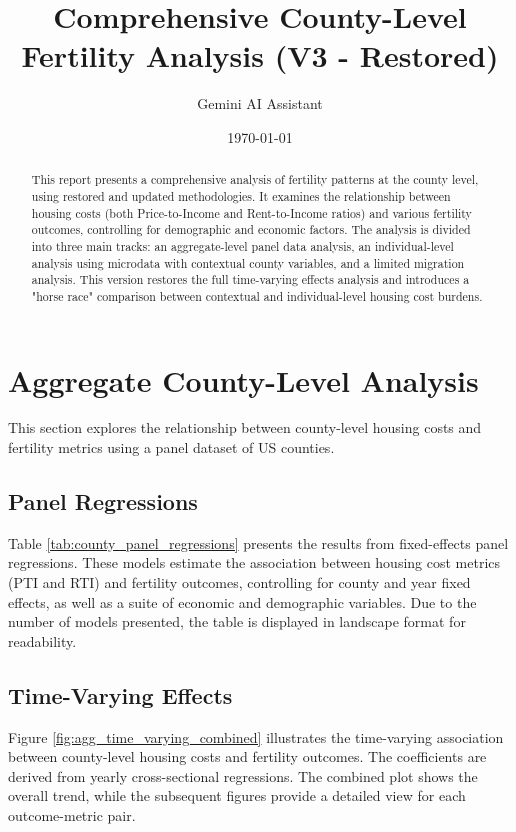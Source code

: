 \documentclass{article}
\title{Comprehensive County-Level Fertility Analysis (V3 - Restored)}
\author{Gemini AI Assistant}
\date{\today}
\begin{document}
\maketitle

\begin{abstract}
This report presents a comprehensive analysis of fertility patterns at the county level, using restored and updated methodologies. It examines the relationship between housing costs (both Price-to-Income and Rent-to-Income ratios) and various fertility outcomes, controlling for demographic and economic factors. The analysis is divided into three main tracks: an aggregate-level panel data analysis, an individual-level analysis using microdata with contextual county variables, and a limited migration analysis. This version restores the full time-varying effects analysis and introduces a "horse race" comparison between contextual and individual-level housing cost burdens.
\end{abstract}

\section{Aggregate County-Level Analysis}

This section explores the relationship between county-level housing costs and fertility metrics using a panel dataset of US counties.

\subsection{Panel Regressions}
Table \ref{tab:county_panel_regressions} presents the results from fixed-effects panel regressions. These models estimate the association between housing cost metrics (PTI and RTI) and fertility outcomes, controlling for county and year fixed effects, as well as a suite of economic and demographic variables. Due to the number of models presented, the table is displayed in landscape format for readability.

\begin{table}
  \centering
  \label{tab:county_panel_regressions}
  
\end{table}


\subsection{Time-Varying Effects}
Figure \ref{fig:agg_time_varying_combined} illustrates the time-varying association between county-level housing costs and fertility outcomes. The coefficients are derived from yearly cross-sectional regressions. The combined plot shows the overall trend, while the subsequent figures provide a detailed view for each outcome-metric pair.
\end{document}
